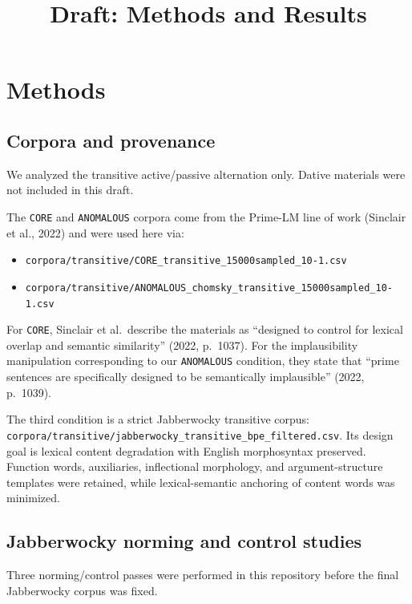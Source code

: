 \documentclass[11pt]{article}
\title{Draft: Methods and Results}
\date{}
\begin{document}
\maketitle

\section*{Methods}

\subsection*{Corpora and provenance}

We analyzed the transitive active/passive alternation only. Dative materials were
not included in this draft.

The \texttt{CORE} and \texttt{ANOMALOUS} corpora come from the Prime-LM line of work
(Sinclair et al., 2022) and were used here via:

\begin{itemize}[leftmargin=*]
    \item \texttt{corpora/transitive/CORE\_transitive\_15000sampled\_10-1.csv}
    \item \texttt{corpora/transitive/ANOMALOUS\_chomsky\_transitive\_15000sampled\_10-1.csv}
\end{itemize}

For \texttt{CORE}, Sinclair et al.\ describe the materials as
``designed to control for lexical overlap and semantic similarity''
(2022, p.~1037). For the implausibility manipulation corresponding to our
\texttt{ANOMALOUS} condition, they state that
``prime sentences are specifically designed to be semantically implausible''
(2022, p.~1039).

The third condition is a strict Jabberwocky transitive corpus:
\texttt{corpora/transitive/jabberwocky\_transitive\_bpe\_filtered.csv}.
Its design goal is lexical content degradation with English morphosyntax
preserved. Function words, auxiliaries, inflectional morphology, and
argument-structure templates were retained, while lexical-semantic anchoring of
content words was minimized.

\subsection*{Jabberwocky norming and control studies}

Three norming/control passes were performed in this repository before the final
Jabberwocky corpus was fixed.
\end{document}
